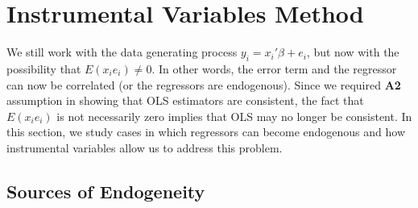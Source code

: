 \documentclass[12pt]{article}
\theoremstyle{definition}
\theoremstyle{property}
\theoremstyle{assumption}
\theoremstyle{example}
\theoremstyle{comment}
\begin{document}
\section{Instrumental Variables Method}

We still work with the data generating process $y_i = x_i'\beta+e_i$, but now with the possibility that $E(x_ie_i)\neq0$. In other words, the error term and the regressor can now be correlated (or the regressors are endogenous). Since we required \textbf{A2} assumption in showing that OLS estimators are consistent, the fact that $E(x_ie_i)$ is not necessarily zero implies that OLS may no longer be consistent. In this section, we study cases in which regressors can become endogenous and how instrumental variables allow us to address this problem. 
\subsection{Sources of Endogeneity}
\end{document}
